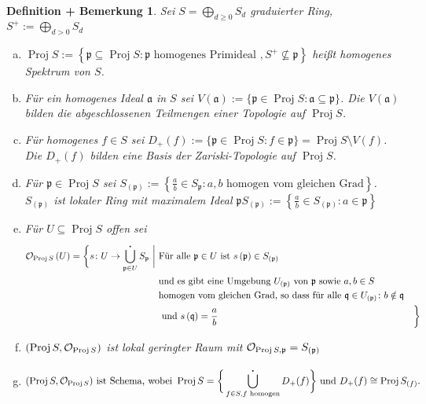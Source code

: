 \documentclass[a4paper,oneside]{scrbook}
\theoremstyle{break}
\newtheorem{DefBem}[Def]{Definition + Bemerkung}
\theoremstyle{nonumberbreak}
\theoremstyle{nonumberplain}
\theoremstyle{break}
\newcommand{\Proj}{%
	\ensuremath{\operatorname{Proj}}%
}
\begin{document}
\begin{DefBem}
	Sei $S = \bigoplus_{d \geq 0} S_d$ graduierter Ring, $S^+:=\bigoplus_{d > 0} S_d$
	\begin{enumerate}[(a)]
		\item  $\Proj S := \left\lbrace \mathfrak{p} \subseteq \Proj S: \mathfrak{p} \text{ homogenes Primideal }, S^+ \nsubseteq \mathfrak{p} \right\rbrace $ heißt \emph{homogenes Spektrum} von $S$.
		\item Für ein homogenes Ideal $\mathfrak a$ in $S$ sei $V(\mathfrak{a}) := \{\mathfrak{p} \in \Proj S : \mathfrak{a \subseteq p} \}$. Die $V(\mathfrak{a})$ bilden die abgeschlossenen Teilmengen einer Topologie auf $\Proj S$.
		\item Für homogenes $f \in S$ sei $D_+(f):=\{\mathfrak{p} \in \Proj S : f \in \mathfrak p\} = \Proj S \setminus V(f)$. Die $D_+(f)$ bilden eine Basis der Zariski-Topologie auf $\Proj S$.
		\item Für $\mathfrak{p} \in \Proj S$ sei $S_{(\mathfrak{p})}:= \left\lbrace \frac{a}{b} \in S_{\mathfrak{p}}:a,b \text{ homogen vom gleichen Grad}  \right\rbrace $. $S_{(\mathfrak{p})}$ ist lokaler Ring mit maximalem Ideal $\mathfrak{p}S_{(\mathfrak{p})} := \left\lbrace \frac{a}{b} \in S_{(\mathfrak{p})} : a \in \mathfrak{p} \right\rbrace $
		\item  Für $U \subseteq \Proj S$ offen sei 
			\begin{align*}
			\mathcal{O}_{\Proj S}\left(U\right) = 
				\bigg\{ s\colon U \to \bigcup_{ \mathfrak{p} \in U }^{\centerdot} S_{\mathfrak{p}}\ \bigg|\
					& \text{Für alle } \mathfrak{p} \in U \text{ ist } s\left(\mathfrak{p}\right) \in S_{(\mathfrak{p})}\\
					& \text{und es gibt eine Umgebung } U_{(\mathfrak{p})} \text{ von } \mathfrak{p}
					\text{ sowie } a,b \in S \\ 
					& \text{homogen vom gleichen Grad, so dass für alle } \mathfrak{q} \in U_{(\mathfrak{p})}\colon b \notin \mathfrak{q} \\
					& \text{ und } s\left(\mathfrak{q}\right) = \frac{a}{b}
					& \bigg\}
		\end{align*}
		\item $(\Proj S, \mathcal{O}_{\Proj S})$ ist lokal geringter Raum mit $\mathcal{O}_{\Proj S, \mathfrak{p}} = S_{(\mathfrak p)}$
		\item \begin{align*} (\Proj S, \mathcal{O}_{\Proj S})  \text{ ist Schema, wobei } \Proj S = \bigg\{\bigcup^{\centerdot}_{ f  \in S, f \text{ homogen} }D_+(f) \bigg\} \text{ und }D_+(f) \cong \Proj S_{(f)}.
		       \end{align*}

	\end{enumerate}
\end{DefBem}
\end{document}
